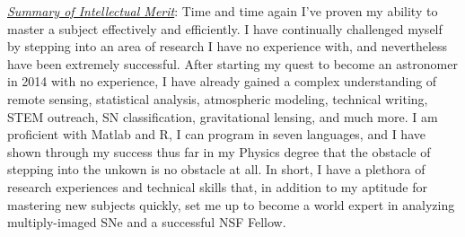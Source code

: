 \underline{\textit{Summary of Intellectual Merit}}:
Time and time again I've proven my ability to master a subject
effectively and efficiently. I have continually challenged myself by
stepping into an area of research I have no experience with, and
nevertheless have been extremely successful. After starting my quest
to become an astronomer in 2014 with no experience, I have already
gained a complex understanding of remote sensing, statistical
analysis, atmospheric modeling, technical writing, STEM outreach, SN
classification, gravitational lensing, and much more. I am proficient
with Matlab and R, I can program in seven languages, and I have shown
through my success thus far in my Physics degree that the obstacle of
stepping into the unkown is no obstacle at all. In short, I have a
plethora of research experiences and technical skills that, in
addition to my aptitude for mastering new subjects quickly, set me up to
become a world expert in analyzing multiply-imaged SNe and a
successful NSF Fellow.



